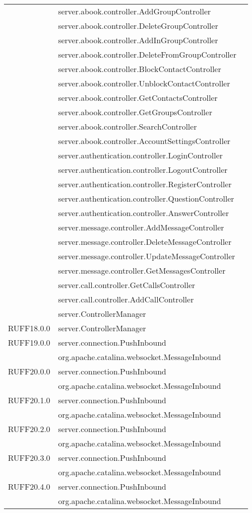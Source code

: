 \begin{center}
\begin{longtable}{lp{}l}
& server.abook.controller.AddGroupController\\
& server.abook.controller.DeleteGroupController\\
& server.abook.controller.AddInGroupController\\
& server.abook.controller.DeleteFromGroupController\\
& server.abook.controller.BlockContactController\\
& server.abook.controller.UnblockContactController\\
& server.abook.controller.GetContactsController\\
& server.abook.controller.GetGroupsController\\
& server.abook.controller.SearchController\\
& server.abook.controller.AccountSettingsController\\
& server.authentication.controller.LoginController\\
& server.authentication.controller.LogoutController\\
& server.authentication.controller.RegisterController\\
& server.authentication.controller.QuestionController\\
& server.authentication.controller.AnswerController\\
& server.message.controller.AddMessageController\\
& server.message.controller.DeleteMessageController\\
& server.message.controller.UpdateMessageController\\
& server.message.controller.GetMessagesController\\
& server.call.controller.GetCallsController\\
& server.call.controller.AddCallController\\
& server.ControllerManager\\
RUFF18.0.0 & server.ControllerManager\\
RUFF19.0.0 & server.connection.PushInbound\\
& org.apache.catalina.websocket.MessageInbound\\
RUFF20.0.0 & server.connection.PushInbound\\
& org.apache.catalina.websocket.MessageInbound\\
RUFF20.1.0 & server.connection.PushInbound\\
& org.apache.catalina.websocket.MessageInbound\\
RUFF20.2.0 & server.connection.PushInbound\\
& org.apache.catalina.websocket.MessageInbound\\
RUFF20.3.0 & server.connection.PushInbound\\
& org.apache.catalina.websocket.MessageInbound\\
RUFF20.4.0 & server.connection.PushInbound\\
& org.apache.catalina.websocket.MessageInbound\\
\bottomrule
\end{longtable}
\end{center}

